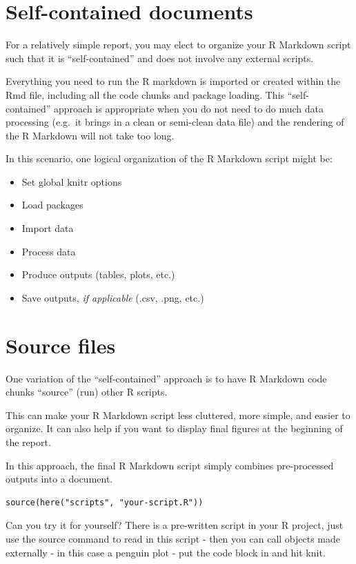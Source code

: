 \documentclass[
]{book}
\makeatletter
\newenvironment{kframe}{%
\medskip{}
\setlength{\fboxsep}{.8em}
 \def\at@end@of@kframe{}%
 \ifinner\ifhmode%
  \def\at@end@of@kframe{\end{minipage}}%
  \begin{minipage}{\columnwidth}%
 \fi\fi%
 \def\FrameCommand##1{\hskip\@totalleftmargin \hskip-\fboxsep
 \colorbox{shadecolor}{##1}\hskip-\fboxsep
     \hskip-\linewidth \hskip-\@totalleftmargin \hskip\columnwidth}%
 \MakeFramed {\advance\hsize-\width
   \@totalleftmargin\z@ \linewidth\hsize
   \@setminipage}}%
 {\par\unskip\endMakeFramed%
 \at@end@of@kframe}
\newenvironment{block}[1]
  {
  \begin{itemize}
  \renewcommand{\labelitemi}{
    \raisebox{-.7\height}[0pt][0pt]{
      {\setkeys{Gin}{width=3em,keepaspectratio}\texttt{[image: images/\#1]}}
    }
  }
  \setlength{\fboxsep}{1em}
  \begin{kframe}
  \item
  }
  {
  \end{kframe}
  \end{itemize}
  }
\newenvironment{rmdquestion}
  {\begin{block}{question}}
  {\end{block}}
\makeatother
\begin{document}
\hypertarget{self-contained-documents}{%
\section{Self-contained documents}\label{self-contained-documents}}

For a relatively simple report, you may elect to organize your R Markdown script such that it is ``self-contained'' and does not involve any external scripts.

Everything you need to run the R markdown is imported or created within the Rmd file, including all the code chunks and package loading. This ``self-contained'' approach is appropriate when you do not need to do much data processing (e.g.~it brings in a clean or semi-clean data file) and the rendering of the R Markdown will not take too long.

In this scenario, one logical organization of the R Markdown script might be:

\begin{itemize}
\item
  Set global knitr options
\item
  Load packages
\item
  Import data
\item
  Process data
\item
  Produce outputs (tables, plots, etc.)
\item
  Save outputs, \emph{if applicable} (.csv, .png, etc.)
\end{itemize}

\hypertarget{source-files}{%
\section{Source files}\label{source-files}}

One variation of the ``self-contained'' approach is to have R Markdown code chunks ``source'' (run) other R scripts.

This can make your R Markdown script less cluttered, more simple, and easier to organize. It can also help if you want to display final figures at the beginning of the report.

In this approach, the final R Markdown script simply combines pre-processed outputs into a document.

\begin{verbatim}
source(here("scripts", "your-script.R"))
\end{verbatim}

\begin{rmdquestion}
Can you try it for yourself? There is a pre-written script in your R
project, just use the source command to read in this script - then you
can call objects made externally - in this case a penguin plot - put the
code block in and hit knit.
\end{rmdquestion}
\end{document}
